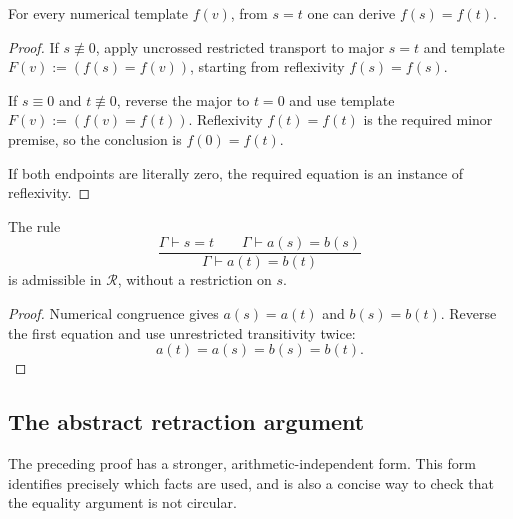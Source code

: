 \begin{lemma}\label{rev:congr}
For every numerical template $f(v)$, from $s=t$ one can derive
$f(s)=f(t)$.
\end{lemma}
\begin{proof}
If $s\not\equiv0$, apply uncrossed restricted transport to major $s=t$
and template $F(v):=(f(s)=f(v))$, starting from reflexivity
$f(s)=f(s)$.

If $s\equiv0$ and $t\not\equiv0$, reverse the major to $t=0$ and use
template $F(v):=(f(v)=f(t))$. Reflexivity $f(t)=f(t)$ is the required
minor premise, so the conclusion is $f(0)=f(t)$.

If both endpoints are literally zero, the required equation is an
instance of reflexivity.
\end{proof}

\begin{theorem}\label{rev:tr-eq}
The rule
\[
 \frac{\Gamma\vdash s=t\qquad\Gamma\vdash a(s)=b(s)}
      {\Gamma\vdash a(t)=b(t)}
\]
is admissible in $\mathcal R$, without a restriction on $s$.
\end{theorem}
\begin{proof}
Numerical congruence gives $a(s)=a(t)$ and $b(s)=b(t)$. Reverse the
first equation and use unrestricted transitivity twice:
\[
                         a(t)=a(s)=b(s)=b(t).
\]
\end{proof}

\subsection{The abstract retraction argument}

The preceding proof has a stronger, arithmetic-independent form. This
form identifies precisely which facts are used, and is also a concise
way to check that the equality argument is not circular.


